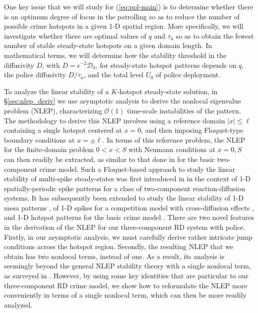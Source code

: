 \documentclass{article}%
\begin{document}
One key issue that we will study for (\ref{eq:pol-main}) is to
determine whether there is an optimum degree of focus in the
patrolling so as to reduce the number of possible crime hotspots in a
given 1-D spatial region. More specifically, we will investigate
whether there are optimal values of $q$ and $\tau_{u}$ so as to obtain
the fewest number of stable steady-state hotspots on a given domain
length. In mathematical terms, we will determine how the stability
threshold in the diffusivity $D$, with $D=\epsilon^{-2}{\mathcal
  D}_0$, for steady-state hotspot patterns depends on $q$, the police
diffusivity ${D/\tau_u}$, and the total level $U_0$ of police
deployment.

To analyze the linear stability of a $K$-hotspot steady-state
solution, in \S \ref{sec:nlep_deriv} we use asymptotic analysis to
derive the nonlocal eigenvalue problem (NLEP), characterizing
${\mathcal O}(1)$ time-scale instabilities of the pattern. The
methodology to derive this NLEP involves using a reference domain
$|x|\leq \ell$ containing a single hotspot centered at $x=0$, and
then imposing Floquet-type boundary conditions at $x=\pm \ell$.  In
terms of this reference problem, the NLEP for the finite-domain
problem $0<x<S$ with Neumann conditions at $x=0,S$ can then readily be
extracted, as similar to that done in \cite{kww_crime} for the basic
two-component crime model.  Such a Floquet-based approach to study the
linear stability of multi-spike steady-states was first introduced in
\cite{floq-ref} in the context of 1-D spatially-periodic spike patterns
for a class of two-component reaction-diffusion systems. It has
subsequently been extended to study the linear stability of 1-D mesa
patterns \cite{mk_mesa}, of 1-D spikes for a competition model with
cross-diffusion effects \cite{kw_xdiff}, and 1-D hotspot patterns for
the basic crime model \cite{kww_crime}. There are two novel features
in the derivation of the NLEP for our three-component RD system with
police. Firstly, in our asymptotic analysis, we must carefully derive
rather intricate jump conditions across the hotspot region. Secondly,
the resulting NLEP that we obtain has two nonlocal terms, instead of
one. As a result, its analysis is seemingly beyond the general NLEP
stability theory with a single nonlocal term, as surveyed in
\cite{wei_rev}.  However, by using some key identities that are
particular to our three-component RD crime model, we show how to
reformulate the NLEP more conveniently in terms of a single nonlocal
term, which can then be more readily analyzed.
\end{document}

